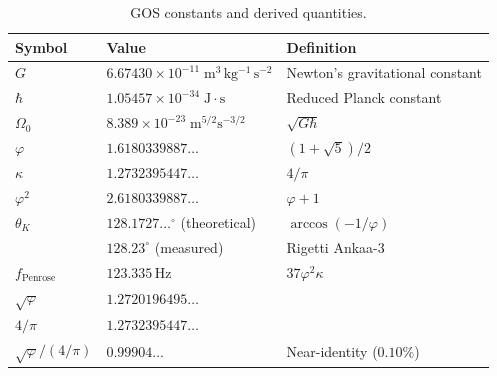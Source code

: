 \documentclass[12pt,a4paper]{article}
\theoremstyle{plain}
\theoremstyle{definition}
\newcommand{\OmegaZero}{\Omega_0}
\newcommand{\thetaK}{\theta_K}
\newcommand{\golden}{\varphi}
\newcommand{\kap}{\kappa}
\newcommand{\Hz}{\,\mathrm{Hz}}
\begin{document}
\begin{table}[H]
\centering
\caption{GOS constants and derived quantities.}
\renewcommand{\arraystretch}{1.3}
\begin{tabular}{lll}
\toprule
\textbf{Symbol} & \textbf{Value} & \textbf{Definition} \\
\midrule
$G$ & $6.67430 \times 10^{-11}\;\mathrm{m^3\,kg^{-1}\,s^{-2}}$ & Newton's gravitational constant \\
$\hbar$ & $1.05457 \times 10^{-34}\;\mathrm{J\cdot s}$ & Reduced Planck constant \\
$\OmegaZero$ & $8.389 \times 10^{-23}\;\mathrm{m}^{5/2}\mathrm{s}^{-3/2}$ & $\sqrt{G\hbar}$ \\
$\golden$ & $1.6180339887\ldots$ & $(1+\sqrt{5})/2$ \\
$\kap$ & $1.2732395447\ldots$ & $4/\pi$ \\
$\golden^2$ & $2.6180339887\ldots$ & $\golden + 1$ \\
$\thetaK$ & $128.1727\ldots^\circ$ (theoretical) & $\arccos(-1/\golden)$ \\
 & $128.23^\circ$ (measured) & Rigetti Ankaa-3 \\
$f_{\mathrm{Penrose}}$ & $123.335\Hz$ & $37\golden^2\kap$ \\
$\sqrt{\golden}$ & $1.2720196495\ldots$ & \\
$4/\pi$ & $1.2732395447\ldots$ & \\
$\sqrt{\golden}/(4/\pi)$ & $0.99904\ldots$ & Near-identity ($0.10\%$) \\
\bottomrule
\end{tabular}
\end{table}

\end{document}
